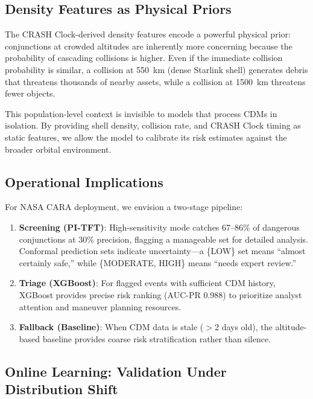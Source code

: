 \documentclass{article}
\begin{document}
\subsection{Density Features as Physical Priors}
\label{sec:density-discussion}

The CRASH Clock-derived density features encode a powerful physical prior: conjunctions at crowded altitudes are inherently more concerning because the probability of cascading collisions is higher. Even if the immediate collision probability is similar, a collision at 550~km (dense Starlink shell) generates debris that threatens thousands of nearby assets, while a collision at 1500~km threatens fewer objects.

This population-level context is invisible to models that process CDMs in isolation. By providing shell density, collision rate, and CRASH Clock timing as static features, we allow the model to calibrate its risk estimates against the broader orbital environment.

\subsection{Operational Implications}
\label{sec:operational}

For NASA CARA deployment, we envision a two-stage pipeline:

\begin{enumerate}
\item \textbf{Screening (PI-TFT)}: High-sensitivity mode catches 67--86\% of dangerous conjunctions at 30\% precision, flagging a manageable set for detailed analysis. Conformal prediction sets indicate uncertainty---a \{LOW\} set means ``almost certainly safe,'' while \{MODERATE, HIGH\} means ``needs expert review.''

\item \textbf{Triage (XGBoost)}: For flagged events with sufficient CDM history, XGBoost provides precise risk ranking (AUC-PR 0.988) to prioritize analyst attention and maneuver planning resources.

\item \textbf{Fallback (Baseline)}: When CDM data is stale ($>$2 days old), the altitude-based baseline provides coarse risk stratification rather than silence.
\end{enumerate}

\subsection{Online Learning: Validation Under Distribution Shift}
\label{sec:online-learning}
\end{document}
